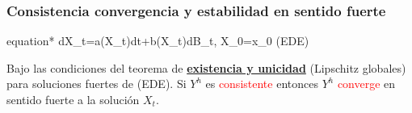 \begin{frame}
	\frametitle{Consistencia convergencia y estabilidad en sentido fuerte}	
	\hypertarget{thm:ConsistenciaConvergencia}{}	
	\begin{empheq}[box={\Garybox[EDE]}]{equation*}
		dX_t=a(X_t)dt+b(X_t)dB_t, \qquad X_0=x_0 \quad (EDE)
	\end{empheq}
	\begin{overlayarea}{\textwidth}{\textheight}
 	 \begin{Teorema}
		Bajo las condiciones del teorema de
		\hyperlink{thm:ExistenciaUnicidadEDE}{ \textbf{existencia y unicidad}} (Lipschitz globales)
		para soluciones fuertes de (EDE). Si $Y^{h}$ es \textcolor{red}{consistente} entonces
		$Y^{h}$ \textcolor{red}{converge} en sentido fuerte a la solución $X_t$.
  \end{Teorema}
	\end{overlayarea}
\end{frame}
